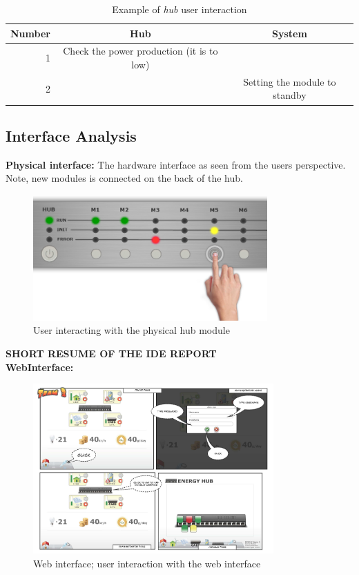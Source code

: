 \begin{table}[H]
	\begin{tabular}{| r | c | c |}
	\hline
		Number	& Hub				& System \\ \hline
		1		& Check the power production (it is to low)	& ~ \\ \hline
		2		& ~											& Setting the module to standby \\ \hline
	\end{tabular}
	\caption{Example of \textit{hub} user interaction}
\end{table}	

\subsection{Interface Analysis}
\textbf{Physical interface: } The hardware interface as seen from the users perspective. Note, new modules is connected on the back of the hub.

\begin{figure}[H]
	\begin{centering}
		 \includegraphics[width=0.8\textwidth]{images/hub_user_interact.png}
		\caption{User interacting with the physical hub module}
	\end{centering}
\end{figure}
\textbf{\huge SHORT RESUME OF THE IDE REPORT}
\\\textbf{WebInterface: }
\begin{figure}[H]
	\begin{centering}
		 \includegraphics[width=0.82\textwidth]{images/web_interface1.jpg}
		\caption{Web interface; user interaction with the web interface}
 	\end{centering}
\end{figure}



